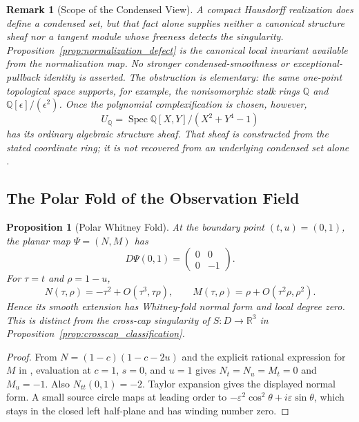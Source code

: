 \documentclass[11pt]{article}
\newtheorem{proposition}[theorem]{Proposition}
\newtheorem{remark}[theorem]{Remark}
\begin{document}
\begin{remark}[Scope of the Condensed View]
A compact Hausdorff realization does define a condensed set, but that fact
alone supplies neither a canonical structure sheaf nor a tangent module whose
freeness detects the singularity.  Proposition~\ref{prop:normalization_defect}
is the canonical local invariant available from the normalization map.  No
stronger condensed-smoothness or exceptional-pullback identity is asserted.
The obstruction is elementary: the same one-point topological space supports,
for example, the nonisomorphic stalk rings $\mathbb Q$ and
$\mathbb Q[\epsilon]/(\epsilon^2)$.  Once the polynomial complexification is
chosen, however,
\[
 U_{\mathbb Q}=\operatorname{Spec}
 \mathbb Q[X,Y]/(X^2+Y^4-1)
\]
has its ordinary algebraic structure sheaf.  That sheaf is constructed from
the stated coordinate ring; it is not recovered from an underlying condensed
set alone \cite{AsgeirssonEtAl2024}.
\end{remark}

\subsection{The Polar Fold of the Observation Field}

\begin{proposition}[Polar Whitney Fold]
\label{prop:polar_fold}
At the boundary point $(t,u)=(0,1)$, the planar map
$\Psi=(N,M)$ has
\[
 D\Psi(0,1)=
 \begin{pmatrix}0&0\\0&-1\end{pmatrix}.
\]
For $\tau=t$ and $\rho=1-u$,
\[
 N(\tau,\rho)=-\tau^2+O(\tau^3,\tau\rho),
 \qquad
 M(\tau,\rho)=\rho+O(\tau^2\rho,\rho^2).
\]
Hence its smooth extension has Whitney-fold normal form and local degree
zero.  This is distinct from the cross-cap singularity of
$S:D\to\mathbb R^3$ in Proposition~\ref{prop:crosscap_classification}.
\end{proposition}

\begin{proof}
From
$N=(1-c)(1-c-2u)$ and the explicit rational expression for $M$ in
\cite{HayamiRuledSurface2026}, evaluation at $c=1$, $s=0$, and $u=1$ gives
$N_t=N_u=M_t=0$ and $M_u=-1$.  Also $N_{tt}(0,1)=-2$.  Taylor expansion gives
the displayed normal form.  A small source circle maps at leading order to
$-\varepsilon^2\cos^2\theta+i\varepsilon\sin\theta$, which stays in the closed
left half-plane and has winding number zero.
\end{proof}
\end{document}
